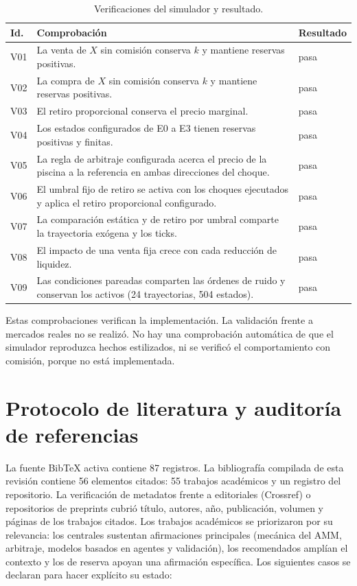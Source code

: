 \begin{table}[htbp]
\centering
\caption{Verificaciones del simulador y resultado.}
\label{tab:verificacion}
\small
\begin{tabularx}{\textwidth}{@{}l X l@{}}
\toprule
Id. & Comprobación & Resultado \\
\midrule
V01 & La venta de $X$ sin comisión conserva $k$ y mantiene reservas positivas. & pasa \\
V02 & La compra de $X$ sin comisión conserva $k$ y mantiene reservas positivas. & pasa \\
V03 & El retiro proporcional conserva el precio marginal. & pasa \\
V04 & Los estados configurados de E0 a E3 tienen reservas positivas y finitas. & pasa \\
V05 & La regla de arbitraje configurada acerca el precio de la piscina a la referencia en ambas direcciones del choque. & pasa \\
V06 & El umbral fijo de retiro se activa con los choques ejecutados y aplica el retiro proporcional configurado. & pasa \\
V07 & La comparación estática y de retiro por umbral comparte la trayectoria exógena y los ticks. & pasa \\
V08 & El impacto de una venta fija crece con cada reducción de liquidez. & pasa \\
V09 & Las condiciones pareadas comparten las órdenes de ruido y conservan los activos (24 trayectorias, 504 estados). & pasa \\
\bottomrule
\end{tabularx}
\end{table}

Estas comprobaciones verifican la implementación. La validación frente a mercados reales no se realizó. No hay una comprobación automática de que el simulador reproduzca hechos estilizados, ni se verificó el comportamiento con comisión, porque no está implementada.

\section{Protocolo de literatura y auditoría de referencias}
\label{sec:protocolo-literatura}

La fuente BibTeX activa contiene 87 registros. La bibliografía compilada de esta revisión contiene 56 elementos citados: 55 trabajos académicos y un registro del repositorio. La verificación de metadatos frente a editoriales (Crossref) o repositorios de preprints cubrió título, autores, año, publicación, volumen y páginas de los trabajos citados. Los trabajos académicos se priorizaron por su relevancia: los centrales sustentan afirmaciones principales (mecánica del AMM, arbitraje, modelos basados en agentes y validación), los recomendados amplían el contexto y los de reserva apoyan una afirmación específica. Los siguientes casos se declaran para hacer explícito su estado:


